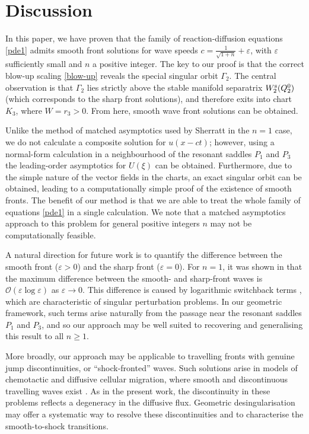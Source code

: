 \documentclass{article}
\theoremstyle{definition}
\numberwithin{equation}{section}
\begin{document}
\section{Discussion}
In this paper, we have proven that the family of reaction-diffusion equations \eqref{pde1} admits smooth front solutions for wave speeds $c=\tfrac{1}{\sqrt{1+n}}+\varepsilon$, with $\varepsilon$ sufficiently small and $n$ a positive integer. The key to our proof is that the correct blow-up scaling \eqref{blow-up} reveals the special singular orbit $\Gamma_2$. The central observation is that $\Gamma_2$ lies strictly above the stable manifold separatrix $W_2^{\rm s}(Q_2^0)$ (which corresponds to the sharp front solutions), and therefore exits into chart $K_3$, where $W=r_3>0$. From here, smooth wave front solutions can be obtained.

Unlike the method of matched asymptotics used by Sherratt \cite{SHERRATT199633,Sherratt2010} in the $n=1$ case, we do not calculate a composite solution for $u(x-ct)$; however, using a normal-form calculation in a neighbourhood of the resonant saddles $P_1$ and $P_3$ 
the leading-order asymptotics for $U(\xi)$ can be obtained. Furthermore, due to the simple nature of the vector fields in the charts, an exact singular orbit can be obtained, leading to a computationally simple proof of the existence of smooth fronts. The benefit of our method is that we are able to treat the whole family of equations \eqref{pde1} in a single calculation. We note that a matched asymptotics approach to this problem for general positive integers $n$ may not be computationally feasible.

A natural direction for future work is to quantify the difference between the smooth
front ($\varepsilon>0$) and the sharp front ($\varepsilon=0$). For $n=1$, it was shown
in \cite{Sherratt2010} that the maximum difference between the smooth-
and sharp-front waves is $\mathcal{O}(\varepsilon\log\varepsilon)$ as $\varepsilon\to 0$.
This difference is caused by logarithmic switchback terms \cite{NPopovic_2005}, which are characteristic of
singular perturbation problems. In our geometric framework, such terms arise naturally
from the passage near the resonant saddles $P_1$ and $P_3$, and so our approach may be
well suited to recovering and generalising this result to all $n\geq 1$.

More broadly, our approach may be applicable to travelling fronts with genuine jump
discontinuities, or ``shock-fronted'' waves. Such solutions arise in models of chemotactic and diffusive cellular migration, where smooth and discontinuous travelling waves exist \cite{Landman2003, Landman2005}. As in the present work, the discontinuity in these problems reflects a degeneracy in the diffusive flux. Geometric desingularisation may offer a systematic way to resolve these discontinuities and to characterise the 
smooth-to-shock transitions.
\end{document}
